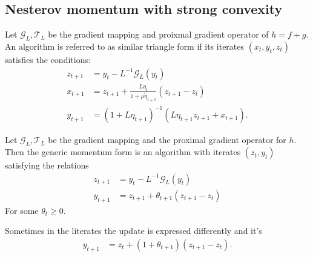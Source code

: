 \documentclass[12pt]{article}
\begin{document}
    \subsection{Nesterov momentum with strong convexity}
        
        \begin{definition}\label{def:s-cvx_similar_triangle_form}
            Let $\mathcal G_L, \mathcal T_L$ be the gradient mapping and proixmal gradient operator of $h = f + g$. 
            An algorithm is referred to as similar triangle form if its iterates $(x_t, y_t, z_t)$ satisfies the conditions: 
            \begin{align*}
                z_{t + 1} &= 
                y_t - L^{-1}\mathcal G_L(y_t)
                \\
                x_{t + 1}&= 
                z_{t + 1} + \frac{L\eta_t}{1 + \mu\tilde \eta_{t + 1}}(z_{t + 1} - z_t)
                \\
                y_{t + 1}&= 
                (1 + L\eta_{t + 1})^{-1} (L\eta_{t + 1}z_{t + 1} + x_{t + 1}). 
            \end{align*}
        \end{definition}

        \begin{definition}\label{def:generic_momentum}
            Let $\mathcal G_L, \mathcal T_L$ be the gradient mapping and the proximal gradient operator for $h$. 
            Then the generic momentum form is an algorithm with iterates $(z_t, y_t)$ satisfying the relations 
            \begin{align*}
                z_{t + 1} &= y_t - L^{-1}\mathcal G_L(y_t)
                \\
                y_{t + 1 } &= z_{t + 1} + \theta_{t + 1}(z_{t + 1} - z_t)
            \end{align*}
            For some $\theta_t \ge 0$. 
        \end{definition}
        \begin{remark}
            Sometimes in the literates the update is expressed differently and it's 
            \begin{align*}
                y_{t + 1} &= z_t + (1 + \theta_{t + 1})(z_{t + 1} - z_t). 
            \end{align*}
        \end{remark}
\end{document}
